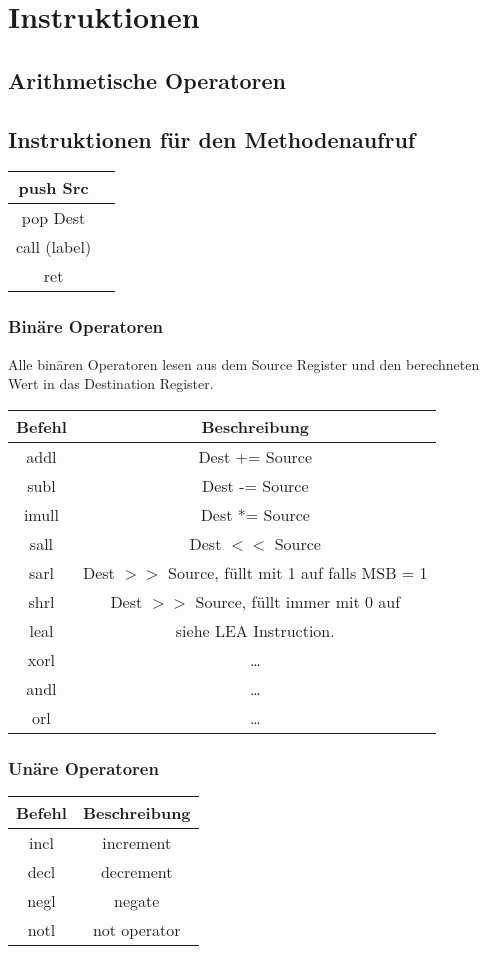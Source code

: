\documentclass[a4paper, 11pt]{article}
\begin{document}
\section{Instruktionen}
\subsection{Arithmetische Operatoren}

\subsection{Instruktionen für den Methodenaufruf}
\begin{tabular}{|c|c|}
	push Src &  \\\hline
	pop Dest & \\\hline
	call (label) &  \\\hline
	ret &  \\\hline
\end{tabular}


\subsubsection{Binäre Operatoren}
Alle binären Operatoren lesen aus dem Source Register und den berechneten Wert in das Destination Register.

\begin{tabular}{|c|c|}
	\hline
	Befehl & Beschreibung\\\hline\hline
	addl & Dest += Source\\\hline
	subl & Dest -= Source \\\hline
	imull & Dest *= Source \\\hline
	sall & Dest $<<$ Source\\\hline
	sarl & Dest $>>$ Source, füllt mit 1 auf falls MSB = 1 \\\hline
	shrl & Dest $>>$ Source, füllt immer mit 0 auf\\\hline
	leal & siehe LEA Instruction. \\\hline
	xorl & \ldots \\\hline
	andl &\ldots  \\\hline
	orl & \ldots \\\hline
\end{tabular}

\subsubsection{Unäre Operatoren}
\begin{tabular}{|c|c|}
	\hline
	Befehl & Beschreibung\\\hline\hline
	incl & increment \\\hline
	decl & decrement \\\hline
	negl & negate \\\hline
	notl & not operator\\\hline
\end{tabular}
\end{document}
